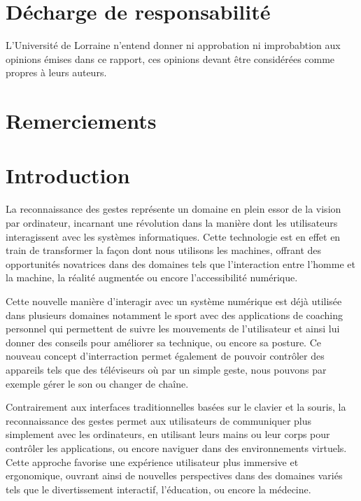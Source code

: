 \documentclass[11pt]{article}
\begin{document}
\newpage \newpage
\section*{Décharge de responsabilité }\bigbreak
L'Université de Lorraine n'entend donner ni approbation  ni improbabtion aux opinions émises dans ce rapport,
ces opinions devant être considérées comme propres à leurs auteurs. \bigbreak

\newpage
\section*{Remerciements}

\newpage
\tableofcontents
\newpage

\setcounter{page}{1}
\section*{Introduction}
La reconnaissance des gestes représente un domaine en plein essor de la vision par ordinateur, incarnant une révolution dans la manière dont les utilisateurs interagissent avec les systèmes informatiques. Cette technologie est en effet en train de transformer la façon dont nous utilisons les machines,
offrant des opportunités novatrices dans des domaines tels que l'interaction entre l'homme et la machine, 
la réalité augmentée ou encore l'accessibilité numérique. \bigbreak

Cette nouvelle manière d'interagir avec un système numérique est déjà utilisée dans plusieurs domaines notamment le sport avec des applications de coaching personnel qui permettent de suivre les mouvements de l'utilisateur et ainsi lui donner des conseils pour améliorer sa technique, ou encore sa posture. Ce nouveau concept d'interraction permet également de pouvoir contrôler des appareils tels que des téléviseurs où par un simple geste, nous pouvons par exemple gérer le son ou changer de chaîne. \bigbreak

Contrairement aux interfaces traditionnelles basées sur le clavier et la souris, la reconnaissance des gestes permet aux utilisateurs de communiquer plus simplement avec les ordinateurs, en utilisant leurs mains ou leur corps pour contrôler les applications, ou encore naviguer dans des environnements virtuels. Cette approche favorise une expérience utilisateur plus immersive et ergonomique, ouvrant ainsi de nouvelles perspectives dans des domaines variés tels que le divertissement interactif, l'éducation, ou encore la médecine. \bigbreak
\end{document}
